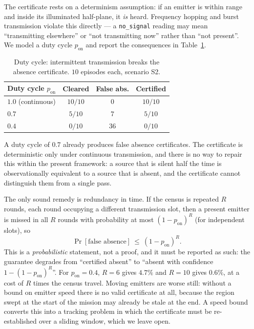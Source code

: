 \documentclass[journal,10pt]{IEEEtran}
\theoremstyle{definition}
\begin{document}
The certificate rests on a determinism assumption: if an emitter is within range and inside its
illuminated half-plane, it \emph{is} heard. Frequency hopping and burst transmission violate this
directly --- a \texttt{no\_signal} reading may mean ``transmitting elsewhere'' or ``not
transmitting now'' rather than ``not present''. We model a duty cycle $p_{\mathrm{on}}$ and report
the consequences in Table~\ref{tab:duty}.

\begin{table}[t]
\caption{Duty cycle: intermittent transmission breaks the absence certificate. $10$ episodes each,
scenario S2.}
\label{tab:duty}
\centering
\small
\begin{tabular}{lccc}
\toprule
Duty cycle $p_{\mathrm{on}}$ & Cleared & \textbf{False abs.} & Certified \\
\midrule
$1.0$ (continuous) & $10/10$ & $0$  & $10/10$ \\
$0.7$              & $5/10$  & $7$  & $5/10$ \\
$0.4$              & $0/10$  & $36$ & $0/10$ \\
\bottomrule
\end{tabular}
\end{table}

A duty cycle of $0.7$ already produces false absence certificates. The certificate is
deterministic only under continuous transmission, and there is no way to repair this within the
present framework: a source that is silent half the time is observationally equivalent to a
source that is absent, and the certificate cannot distinguish them from a single pass.

The only sound remedy is redundancy in time. If the census is repeated $R$ rounds, each round
occupying a different transmission slot, then a present emitter is missed in all $R$ rounds with
probability at most $(1-p_{\mathrm{on}})^R$ (for independent slots), so
\begin{equation}
\Pr[\text{false absence}]\ \le\ (1-p_{\mathrm{on}})^R .
\label{eq:rounds}
\end{equation}
This is a \emph{probabilistic} statement, not a proof, and it must be reported as such: the
guarantee degrades from ``certified absent'' to ``absent with confidence $1-(1-p_{\mathrm{on}})^R$''.
For $p_{\mathrm{on}}=0.4$, $R=6$ gives $4.7\%$ and $R=10$ gives $0.6\%$, at a cost of $R$ times
the census travel. Moving emitters are worse still: without a bound on emitter speed there is no
valid certificate at all, because the region swept at the start of the mission may already be
stale at the end. A speed bound converts this into a tracking problem in which the certificate
must be re-established over a sliding window, which we leave open.
\end{document}
